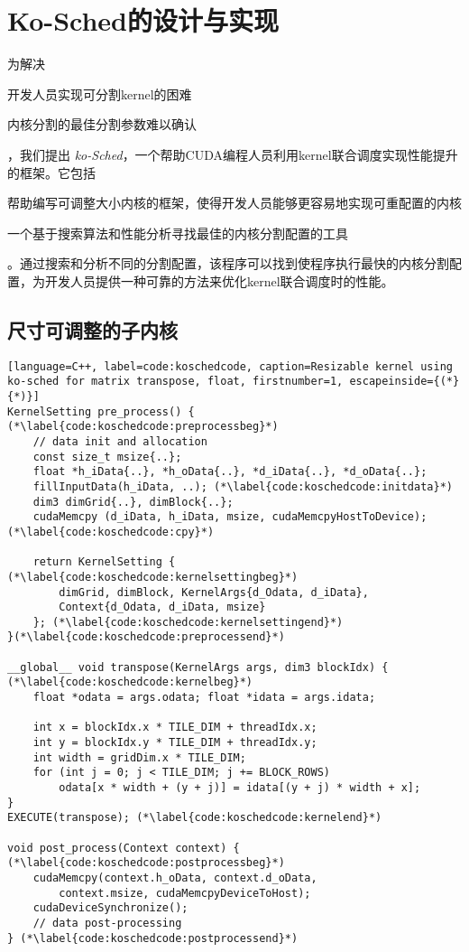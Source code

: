 \chapter{Ko-Sched的设计与实现}\label{chapter:design-implementation}

为解决
\begin{enumerate*}[label=\roman*),itemjoin={\quad}]
    \item 开发人员实现可分割kernel的困难
    \item 内核分割的最佳分割参数难以确认
\end{enumerate*}
，我们提出 \emph{ko-Sched}，一个帮助CUDA编程人员利用kernel联合调度实现性能提升的框架。它包括
\begin{enumerate*}[label=\roman*),itemjoin={\quad}]
    \item 帮助编写可调整大小内核的框架，使得开发人员能够更容易地实现可重配置的内核
    \item 一个基于搜索算法和性能分析寻找最佳的内核分割配置的工具
\end{enumerate*}
。通过搜索和分析不同的分割配置，该程序可以找到使程序执行最快的内核分割配置，为开发人员提供一种可靠的方法来优化kernel联合调度时的性能。

\section{尺寸可调整的子内核}

\begin{lstlisting}[language=C++, label=code:koschedcode, caption=Resizable kernel using ko-sched for matrix transpose, float, firstnumber=1, escapeinside={(*}{*)}]
KernelSetting pre_process() { (*\label{code:koschedcode:preprocessbeg}*)
    // data init and allocation
    const size_t msize{..};
    float *h_iData{..}, *h_oData{..}, *d_iData{..}, *d_oData{..};
    fillInputData(h_iData, ..); (*\label{code:koschedcode:initdata}*)
    dim3 dimGrid{..}, dimBlock{..};
    cudaMemcpy (d_iData, h_iData, msize, cudaMemcpyHostToDevice); (*\label{code:koschedcode:cpy}*)

    return KernelSetting { (*\label{code:koschedcode:kernelsettingbeg}*)
        dimGrid, dimBlock, KernelArgs{d_Odata, d_iData}, 
        Context{d_Odata, d_iData, msize}
    }; (*\label{code:koschedcode:kernelsettingend}*)
}(*\label{code:koschedcode:preprocessend}*)

__global__ void transpose(KernelArgs args, dim3 blockIdx) { (*\label{code:koschedcode:kernelbeg}*)
    float *odata = args.odata; float *idata = args.idata;

    int x = blockIdx.x * TILE_DIM + threadIdx.x;
    int y = blockIdx.y * TILE_DIM + threadIdx.y;
    int width = gridDim.x * TILE_DIM;
    for (int j = 0; j < TILE_DIM; j += BLOCK_ROWS)
        odata[x * width + (y + j)] = idata[(y + j) * width + x];
}
EXECUTE(transpose); (*\label{code:koschedcode:kernelend}*)

void post_process(Context context) { (*\label{code:koschedcode:postprocessbeg}*)
    cudaMemcpy(context.h_oData, context.d_oData, 
        context.msize, cudaMemcpyDeviceToHost);
    cudaDeviceSynchronize();
    // data post-processing
} (*\label{code:koschedcode:postprocessend}*)
\end{lstlisting}

